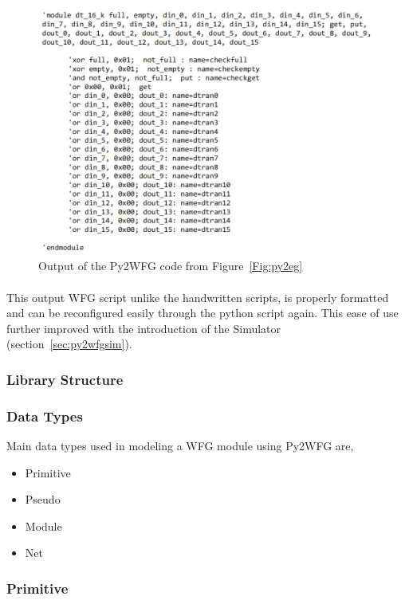\begin{figure}[H]
    \centering
    \includegraphics[trim=0cm 0cm 0cm 0cm, clip=true,scale=0.5]{figures/wfg_out.jpg}
    \caption{Output of the Py2WFG code from Figure~\ref{Fig:py2eg}\label{Fig:wfgout}}\vspace{-4mm}
    \end{figure}

\paragraph{}
This output WFG script unlike the handwritten scripts, is properly formatted and can be reconfigured easily through the python script again. This ease of use further improved with the introduction of the Simulator (section~\ref{sec:py2wfgsim}).

\subsubsection{Library Structure}
\subsubsection*{Data Types}
Main data types used in modeling a WFG module using Py2WFG are,
\begin{itemize}
    \item Primitive
    \item Pseudo
    \item Module
    \item Net
\end{itemize}

\subsubsection*{Primitive}
